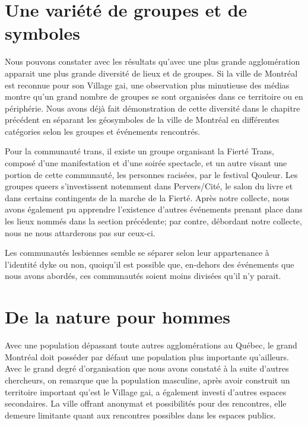 \section{Une variété de groupes et de symboles}
\label{sec:une_variete_de_groupes_et_de_symboles}
Nous pouvons constater avec les résultats qu'avec une plus grande agglomération apparait une plus grande diversité de lieux et de groupes.
Si la ville de Montréal est reconnue pour son Village gai, une observation plus minutieuse des médias \lgbt montre qu'un grand nombre de groupes se sont organisées dans ce territoire ou en périphérie.
Nous avons déjà fait démonstration de cette diversité dans le chapitre précédent en séparant les géosymboles de la ville de Montréal en différentes catégories selon les groupes et événements rencontrés.

Pour la communauté trans, il existe un groupe organisant la Fierté Trans, composé d'une manifestation et d'une soirée spectacle, et un autre visant une portion de cette communauté, les personnes racisées, par le festival Qouleur.
Les groupes queers s'investissent notemment dans Pervers/Cité, le salon du livre  et dans certains contingents de la marche de la Fierté. 
Après notre collecte, nous avons également pu apprendre l'existence d'autres événements prenant place dans les lieux nommés dans la section précédente; par contre, débordant notre collecte, nous ne nous attarderons pas sur ceux-ci.

Les communautés lesbiennes semble se séparer selon leur appartenance à l'identité dyke ou non, quoiqu'il est possible que, en-dehors des événements que nous avons abordés, ces communautés soient moins divisées qu'il n'y parait.


\section{De la nature pour hommes}
\label{sec:de_la_nature_pour_hommes}
Avec une population dépassant toute autres agglomérations au Québec, le grand Montréal doit posséder par défaut une population \lgbt{} plus importante qu'ailleurs.
Avec le grand degré d'organisation que nous avons constaté à la suite d'autres chercheurs, on remarque que la population masculine, après avoir construit un territoire important qu'est le Village gai, a également investi d'autres espaces secondaires.
La ville offrant anonymat et possibilités pour des rencontres, elle demeure limitante quant aux rencontres possibles dans les espaces publics.

